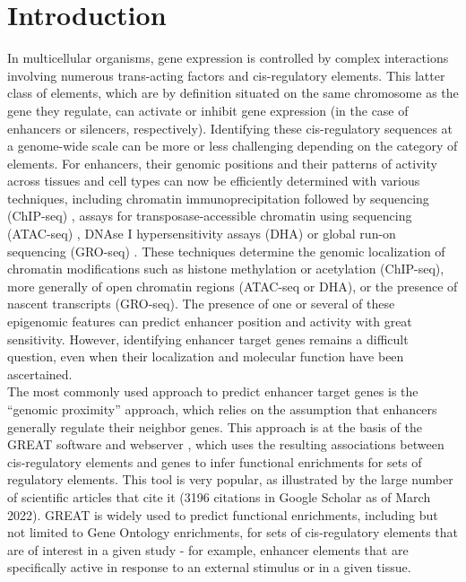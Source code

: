 \section{Introduction}
In multicellular organisms, gene expression is controlled by complex interactions involving numerous trans-acting factors and \gls{cis}-regulatory elements. This latter class of elements, which are by definition situated on the same chromosome as the gene they regulate, can activate or inhibit gene expression (in the case of enhancers or silencers, respectively). Identifying these \gls{cis}-regulatory sequences at a genome-wide scale can be more or less challenging depending on the category of elements. For enhancers, their genomic positions and their patterns of activity across tissues and cell types can now be efficiently determined with various techniques, including chromatin immunoprecipitation followed by sequencing (ChIP-seq) \citep{wei_global_2006,visel_chip-seq_2009}, assays for transposase-accessible chromatin using sequencing (ATAC-seq) \citep{buenrostro_transposition_2013}, DNAse I hypersensitivity assays (DHA) \citep{thurman_accessible_2012} or global run-on sequencing (GRO-seq) \citep{core_nascent_2008}. These techniques determine the genomic localization of chromatin modifications such as histone methylation or acetylation (ChIP-seq), more generally of open chromatin regions (ATAC-seq or DHA), or the presence of nascent transcripts (GRO-seq). The presence of one or several of these epigenomic features can predict enhancer position and activity with great sensitivity. However, identifying enhancer target genes remains a difficult question, even when their localization and molecular function have been ascertained. \\

The most commonly used approach to predict enhancer target genes is the “genomic proximity” approach, which relies on the assumption that enhancers generally regulate their neighbor genes. This approach is at the basis of the GREAT software and webserver \citep{mclean_great_2010}, which uses the resulting associations between \gls{cis}-regulatory elements and genes to infer functional enrichments for sets of regulatory elements. This tool is very popular, as illustrated by the large number of scientific articles that cite it (3196 citations in Google Scholar as of March 2022). GREAT is widely used to predict functional enrichments, including but not limited to Gene Ontology enrichments, for sets of \gls{cis}-regulatory elements that are of interest in a given study - for example, enhancer elements that are specifically active in response to an external stimulus or in a given tissue. \\ 

